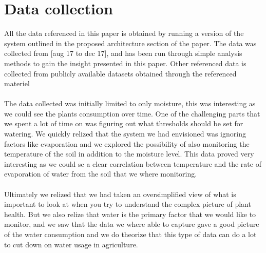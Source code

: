 \documentclass[]{uiophd}
\begin{document}
\section{Data collection}
All the data referenced in this paper is obtained by running a version of the system outlined in the proposed architecture section of the paper. The data was collected from [aug 17 to dec 17], and has been run through simple analysis methods to gain the insight presented in this paper.  Other referenced data is collected from publicly available datasets obtained through the referenced materiel
\\\\
The data collected was initially limited to only moisture, this was interesting as we could see the plants consumption over time. One of the challenging parts that we spent a lot of time on was figuring out what thresholds should be set for watering. We quickly relized that the system we had envisioned was ignoring factors like evaporation and we explored the possibility of also monitoring the temperature of the soil in addition to the moisture level. This data proved very interesting as we could se a clear correlation between temperature and the rate of evaporation of water from the soil that we where monitoring.
\\\\
Ultimately we relized that we had taken an oversimplified view of what is important to look at when you try to understand the complex picture of plant health. But we also relize that water is the primary factor that we would like to monitor, and we saw that the data we where able to capture gave a good picture of the water consumption and we do theorize that this type of data can do a lot to cut down on water usage in agriculture.
\end{document}
